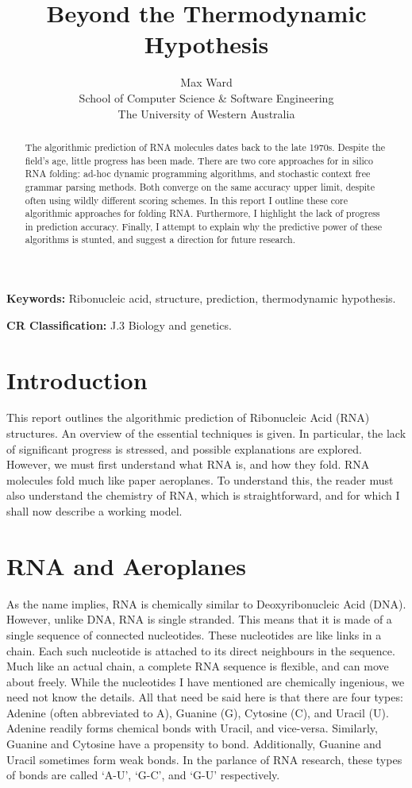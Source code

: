 \documentclass[12pt, a4paper]{article}
\title{Beyond the Thermodynamic Hypothesis}
\author{Max Ward \\
School of Computer Science \& Software Engineering \\
The University of Western Australia}
\begin{document}
\maketitle

\begin{abstract}
The algorithmic prediction of RNA molecules dates back to the late 1970s. Despite the field's age, little progress has been made. There are two core approaches for in silico RNA folding: ad-hoc dynamic programming algorithms, and stochastic context free grammar parsing methods. Both converge on the same accuracy upper limit, despite often using wildly different scoring schemes. In this report I outline these core algorithmic approaches for folding RNA. Furthermore, I highlight the lack of progress in prediction accuracy. Finally, I attempt to explain why the predictive power of these algorithms is stunted, and suggest a direction for future research.
\end{abstract}


{\bf Keywords:} Ribonucleic acid, structure, prediction, thermodynamic hypothesis.

{\bf CR Classification:} J.3 Biology and genetics.

\clearpage

\tableofcontents
\listoffigures
\clearpage

\section{Introduction}
This report outlines the algorithmic prediction of Ribonucleic Acid (RNA) structures. An overview of the essential techniques is given. In particular, the lack of significant progress is stressed, and possible explanations are explored. However, we must first understand what RNA is, and how they fold. RNA molecules fold much like paper aeroplanes. To understand this, the reader must also understand the chemistry of RNA, which is straightforward, and for which I shall now describe a working model.

\section{RNA and Aeroplanes} 
As the name implies, RNA is chemically similar to Deoxyribonucleic Acid (DNA). However, unlike DNA, RNA is single stranded. This means that it is made of a single sequence of connected nucleotides. These nucleotides are like links in a chain. Each such nucleotide is attached to its direct neighbours in the sequence. Much like an actual chain, a complete RNA sequence is flexible, and can move about freely. While the nucleotides I have mentioned are chemically ingenious, we need not know the details. All that need be said here is that there are four types: Adenine (often abbreviated to A), Guanine (G), Cytosine (C), and Uracil (U). Adenine readily forms chemical bonds with Uracil, and vice-versa. Similarly, Guanine and Cytosine have a propensity to bond. Additionally, Guanine and Uracil sometimes form weak bonds. In the parlance of RNA research, these types of bonds are called `A-U', `G-C', and `G-U' respectively.
\end{document}
